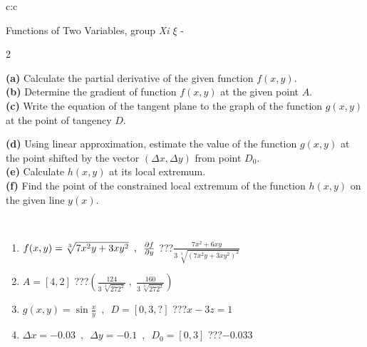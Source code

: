 \documentclass[10pt]{report}
\begin{document}
\begin{tabular}{c:c}
\begin{minipage}[c][104.5mm][t]{0.5\linewidth}
\begin{center}
\vspace{7mm}
{\huge \LARGE Functions of Two Variables, group \textit{Xi $\xi$} -}\\[5mm]
\begin{minipage}{0.95\linewidth}
\begin{center}
{\small \begin{multicols}{2} \raggedright
\textbf{(a)} Calculate the partial derivative of the given function \(f(x,y)\). \\[1mm]
\textbf{(b)} Determine the gradient of function \(f(x,y)\) at the given point \(A\). \\[1mm]
\textbf{(c)} Write the equation of the tangent plane to the graph of the function \(g(x,y)\) at the point of tangency \(D\). \par \columnbreak
\textbf{(d)} Using linear approximation, estimate the value of the function \(g(x,y)\) at the point shifted by the vector \((\Delta x, \Delta y)\) from point \(D_0\). \\[1mm]
\textbf{(e)} Calculate \(h(x,y)\) at its local extremum. \\[1mm]
\textbf{(f)} Find the point of the constrained local extremum of the function \(h(x,y)\) on the given line \(y(x)\). \\[1mm]
\end{multicols}
}
\end{center}
\end{minipage}
\\[4mm]
\begin{minipage}{0.79\linewidth}
\begin{center}
\begin{varwidth}{\linewidth}
\begin{enumerate}
\normalsizerr
\item $f(x,y) = \sqrt[3]{7x^2y + 3xy^2}\enspace , \enspace \pdv{f}{y}$\quad \dotfill\; ???\;\dotfill \quad $\frac{7x^2+6xy}{3\,\sqrt[3]{(7x^2y+3xy^2)^{2}}}$
\item $A = [4, 2]$\quad \dotfill\; ???\;\dotfill \quad $\left( \frac{124}{3\,\sqrt[3]{272^2}} \;,\; \frac{160}{3\,\sqrt[3]{272^2}} \right)$
\item $g(x,y) = \sin\frac{x}{y} \enspace , \enspace D = [0, 3, ?]$\quad \dotfill\; ???\;\dotfill \quad $x-3z=1$
\item $\Delta x = {-0.03} \enspace,\enspace \Delta y = {-0.1} \enspace,\enspace D_0 = [0,3]$\quad \dotfill\; ???\;\dotfill \quad $-0.033$

\end{enumerate}
\end{varwidth}
\end{center}
\end{minipage}
\end{center}
\end{minipage}
\end{tabular}
\end{document}
